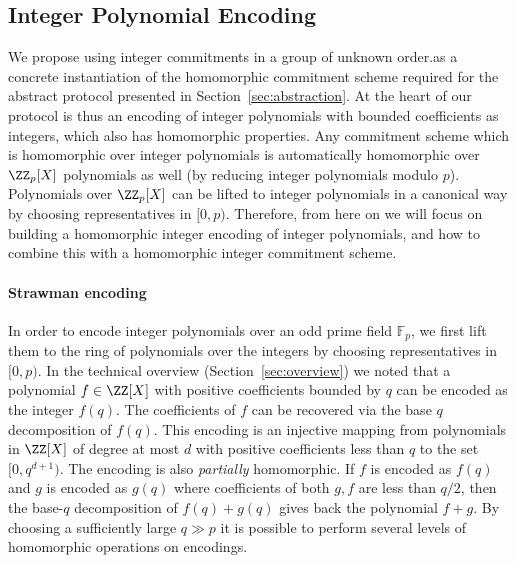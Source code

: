 \subsection{Integer Polynomial Encoding}
\label{sec:encoding}
We propose using integer commitments in a group of unknown order.as a concrete instantiation of the homomorphic commitment scheme required for the abstract protocol presented in Section~\ref{sec:abstraction}. At the heart of our protocol is thus an encoding of integer polynomials with bounded coefficients as integers, which also has homomorphic properties. Any commitment scheme which is homomorphic over integer polynomials is automatically homomorphic over $\ZZ_p[X]$ polynomials as well (by reducing integer polynomials modulo $p$). Polynomials over $\ZZ_p[X]$ can be lifted to integer polynomials in a canonical way by choosing representatives in $[0,p)$. Therefore, from here on we will focus on building a homomorphic integer encoding of integer polynomials, and how to combine this with a homomorphic integer commitment scheme. 

\paragraph{Strawman encoding} In order to encode integer polynomials over an odd prime field $\mathbb{F}_p$, we first lift them to the ring of polynomials over the integers by choosing representatives in $[0,p)$. In the technical overview (Section~\ref{sec:overview}) we noted that a polynomial $f \in \ZZ[X]$ with positive coefficients bounded by $q$ can be encoded as the integer $f(q)$.   
The coefficients of $f$ can be recovered via the base $q$ decomposition of $f(q)$. %
This encoding is an injective mapping from polynomials in $\ZZ[X]$ of degree at most $d$ with positive coefficients less than $q$ to the set $[0, q^{d+1})$. The encoding is also \emph{partially} homomorphic. 
If $f$ is encoded as $f(q)$ and $g$ is encoded as $g(q)$ where coefficients of both $g, f$ are less than $q/2$, then the base-$q$ decomposition of $f(q) + g(q)$ gives back the polynomial $f + g$. 
By choosing a sufficiently large $q \gg p$ it is possible to perform several levels of homomorphic operations on encodings. 

